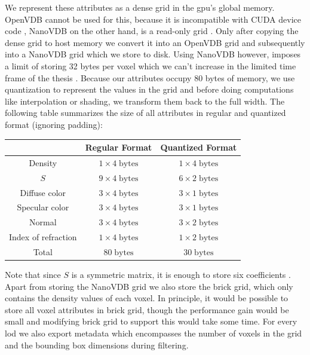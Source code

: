We represent these attributes as a dense grid in the \acs{gpu}'s global memory.
OpenVDB cannot be used for this, because it is incompatible with CUDA device code \cite{museth_nanovdb}, NanoVDB on the other hand, is a read-only grid \cite{nanovdb}.
Only after copying the dense grid to host memory we convert it into an OpenVDB grid and subsequently into a NanoVDB grid which we store to disk.
Using NanoVDB however, imposes a limit of storing 32 bytes per voxel which we can't increase in the limited time frame of the thesis \cite{open_to_nanovdb}.
Because our attributes occupy 80 bytes of memory, we use quantization to represent the values in the grid and before doing computations like interpolation or shading, we transform them back to the full width.
The following table summarizes the size of all attributes in regular and quantized format (ignoring padding):
\begin{center}
    \begin{tabular}{| c | c | c | }
        \hline
         & Regular Format & Quantized Format \\
         \hline
         Density & $1\times 4\;\text{bytes}$ & $1\times 4\;\text{bytes}$ \\
         \hline
         $S$ & $9\times 4\;\text{bytes}$ & $6\times 2\;\text{bytes}$ \\
         \hline
         Diffuse color & $3\times 4\;\text{bytes}$ & $3\times 1\;\text{bytes}$ \\
         \hline
         Specular color & $3\times 4\;\text{bytes}$ & $3\times 1\;\text{bytes}$ \\
         \hline
         Normal & $3\times 4\;\text{bytes}$ & $3\times 2\;\text{bytes}$ \\
         \hline
         Index of refraction & $1\times 4\;\text{bytes}$ & $1\times 2\;\text{bytes}$ \\
         \thickhline
         Total & $80\;\text{bytes}$ & $30\;\text{bytes}$ \\
         \hline
    \end{tabular}
\end{center}
Note that since $S$ is a symmetric matrix, it is enough to store six coefficients \cite{sggx}.
Apart from storing the NanoVDB grid we also store the brick grid, which only contains the density values of each voxel.
In principle, it would be possible to store all voxel attributes in brick grid, though the performance gain would be small and modifying brick grid to support this would take some time.
For every \ac{lod} we also export metadata which encompasses the number of voxels in the grid and the bounding box dimensions during filtering.

